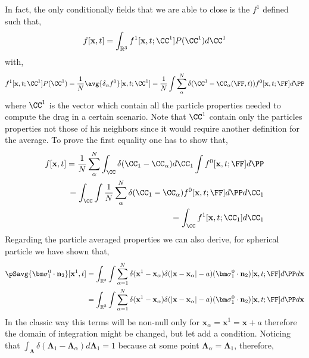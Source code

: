 In fact, the only conditionally fields that we are able to close is the $f^1$ defined such that, 
\begin{equation}
    f[\textbf{x},t]
    = \int_{\mathbb{R}^3}
    f^1[\textbf{x},t;\CC^1]
    P(\CC^1) d\CC^1
    \label{eq:avg_cond_C1}
\end{equation}
with, 
\begin{equation*}
    f^1[\textbf{x},t;\CC^1] P(\CC^1)
    =
    \frac{1}{N} 
    \avg{\delta_\alpha f^0}[\textbf{x},t;\CC^1]
    = 
    \frac{1}{N}
    \int 
    \sum_\alpha^N \delta(\CC^1 - \CC_\alpha(\FF,t))
    f^0[\textbf{x},t;\FF]
    d\PP
\end{equation*}
where $\CC^1$ is the vector which contain all the particle properties needed to compute the drag in a certain scenario. 
Note that $\CC^1$ contain only the particles properties not those of his neighbors since it would require another definition for the average. 
To prove the first equality one has to show that, 
\begin{align*}
    f[\textbf{x},t]
    = \frac{1}{N}\sum_\alpha^N\int_{\CC} \delta(\CC_1 - \CC_\alpha) d\CC_1
    \int
    f^0[\textbf{x},t;\FF]
    d\PP\\
    = 
    \int_{\CC} 
    \int
    \frac{1}{N}\sum_\alpha^N
    \delta(\CC_1 - \CC_\alpha) 
    f^0[\textbf{x},t;\FF]
    d\PP
    d\CC_1
    \\
    = 
    \int_{\CC} 
    f^1[\textbf{x},t;\CC_1]
    d\CC_1
\end{align*}
Regarding the particle averaged properties we can also derive, for spherical particle we have shown that,
\begin{align}
    \pSavg{\bm\sigma_1^0\cdot\textbf{n}_2}[\textbf{x}^1,t]
    = 
    \int_{\mathbb{R}^3}
    \int
     \sum_{\alpha=1}^N \delta(\textbf{x}^1-\textbf{x}_\alpha)
    \delta(|\textbf{x} - \textbf{x}_{\alpha}|-a)
    (\bm\sigma_1^0\cdot\textbf{n}_2)[\textbf{x},t;\FF]
    d\PP
    d\textbf{x}\\
    = 
    \int_{\mathbb{R}^3}
    \int
     \sum_{\alpha=1}^N \delta(\textbf{x}^1-\textbf{x}_\alpha)
    \delta(|\textbf{x} - \textbf{x}_{\alpha}|-a)
    (\bm\sigma_1^0\cdot\textbf{n}_2)[\textbf{x},t;\FF]
    d\PP
    d\textbf{x}\\
\end{align}
In the classic way this terms will be non-null only for $\textbf{x}_\alpha = \textbf{x}^1 = \textbf{x} + a$ therefore the domain of integration might be changed, but let add a condition. 
Noticing that $\int_{\bm\Lambda} \delta(\bm\Lambda_1 - \bm\Lambda_\alpha) d\bm\Lambda_1 = 1$ because at some point $\bm\Lambda_\alpha=\bm\Lambda_1$, therefore, 
